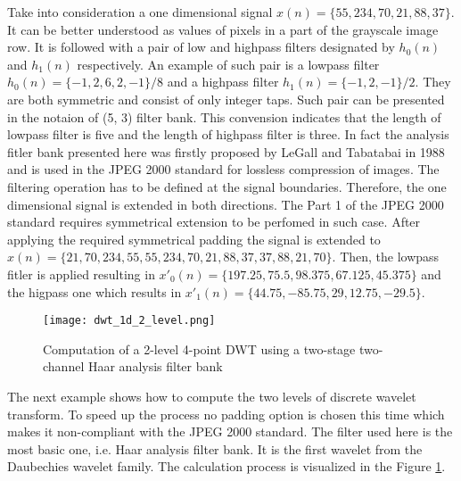 Take into consideration a one dimensional signal $x(n) = \{55, 234, 70, 21, 88, 37\}$. It can be better
understood as values of pixels in a part of the grayscale image row. It is followed with a pair of low
and highpass filters designated by $h_{0}(n)$ and $h_{1}(n)$ respectively. An example of such pair is
a lowpass filter $h_{0}(n) = \{-1, 2, 6, 2, -1\}/8$ and a highpass filter $h_{1}(n) = \{-1, 2, -1\}/2$. They are both
symmetric and consist of only integer taps. Such pair can be presented in the notaion of (5, 3) filter bank.
This convension indicates that the length of lowpass filter is five and the length of highpass filter is three.
In fact the analysis fitler bank presented here was firstly proposed by LeGall and Tabatabai in 1988 and
is used in the JPEG 2000 standard for lossless compression of images. The filtering operation has to
be defined at the signal boundaries. Therefore, the one dimensional signal is extended in both directions.
The Part 1 of the JPEG 2000 standard requires symmetrical extension to be perfomed in such case. \cite{jpeg_suite}
After applying the required symmetrical padding the signal is extended to
$x(n) = \{21, 70, 234, 55, 55, 234, 70, 21, 88, 37, 37, 88, 21, 70\}$. Then, the lowpass fitler is applied
resulting in $x'_{0}(n) = \{197.25, 75.5, 98.375, 67.125, 45.375\}$ and the higpass one which results in
$x'_{1}(n) = \{44.75, -85.75, 29, 12.75, -29.5\}$.

\begin{figure}
    \centering
    \texttt{[image: dwt\_1d\_2\_level.png]}
    \caption{Computation of a 2-level 4-point DWT using a two-stage two-channel Haar analysis filter bank \cite{dwt_impl}}
    \label{fig:dwt_1d_2_level}
\end{figure}

The next example shows how to compute the two levels of discrete wavelet transform. To speed up the process
no padding option is chosen this time which makes it non-compliant with the JPEG 2000 standard.
The filter used here is the most basic one, i.e. Haar analysis filter bank. It is the first wavelet
from the Daubechies wavelet family. The calculation process is visualized in the Figure \ref{fig:dwt_1d_2_level}. \cite{dwt_impl}

